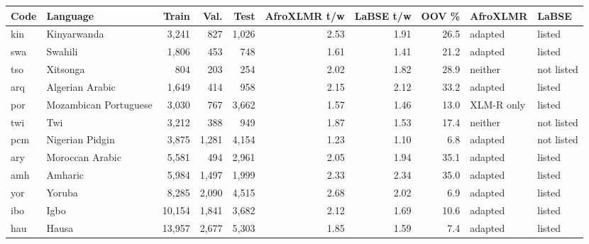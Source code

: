 \begin{tabular}{llrrrrrrll}
\toprule
Code & Language & Train & Val. & Test & AfroXLMR t/w & LaBSE t/w & OOV \% & AfroXLMR & LaBSE \\
\midrule
kin & Kinyarwanda & 3,241 & 827 & 1,026 & 2.53 & 1.91 & 26.5 & adapted & listed \\
swa & Swahili & 1,806 & 453 & 748 & 1.61 & 1.41 & 21.2 & adapted & listed \\
tso & Xitsonga & 804 & 203 & 254 & 2.02 & 1.82 & 28.9 & neither & not listed \\
arq & Algerian Arabic & 1,649 & 414 & 958 & 2.15 & 2.12 & 33.2 & adapted & listed \\
por & Mozambican Portuguese & 3,030 & 767 & 3,662 & 1.57 & 1.46 & 13.0 & XLM-R only & listed \\
twi & Twi & 3,212 & 388 & 949 & 1.87 & 1.53 & 17.4 & neither & not listed \\
pcm & Nigerian Pidgin & 3,875 & 1,281 & 4,154 & 1.23 & 1.10 & 6.8 & adapted & not listed \\
ary & Moroccan Arabic & 5,581 & 494 & 2,961 & 2.05 & 1.94 & 35.1 & adapted & listed \\
amh & Amharic & 5,984 & 1,497 & 1,999 & 2.33 & 2.34 & 35.0 & adapted & listed \\
yor & Yoruba & 8,285 & 2,090 & 4,515 & 2.68 & 2.02 & 6.9 & adapted & listed \\
ibo & Igbo & 10,154 & 1,841 & 3,682 & 2.12 & 1.69 & 10.6 & adapted & listed \\
hau & Hausa & 13,957 & 2,677 & 5,303 & 1.85 & 1.59 & 7.4 & adapted & listed \\
\bottomrule
\end{tabular}
